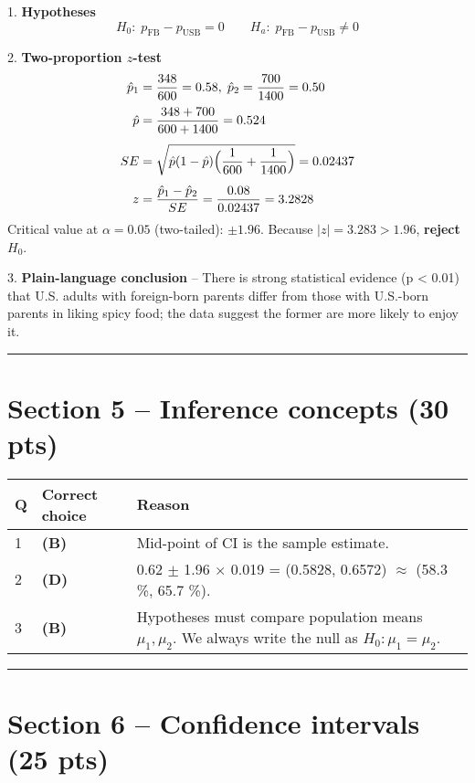 \documentclass{article}
\begin{document}
1. \textbf{Hypotheses}
$$
H_0:\;p_{\text{FB}}-p_{\text{USB}}=0 \qquad
H_a:\;p_{\text{FB}}-p_{\text{USB}}\neq 0
$$

2. \textbf{Two-proportion $z$-test}
$$
\begin{aligned}
\hat p_1&=\frac{348}{600}=0.58,\;
\hat p_2=\frac{700}{1400}=0.50\\[2pt]
\hat p&=\frac{348+700}{600+1400}=0.524\\[4pt]
SE&=\sqrt{\hat p(1-\hat p)\Bigl(\frac1{600}+\frac1{1400}\Bigr)}=0.02437\\[4pt]
z&=\frac{\hat p_1-\hat p_2}{SE}=\frac{0.08}{0.02437}=3.2828
\end{aligned}
$$
Critical value at $\alpha = 0.05$ (two-tailed): $\pm1.96$.
Because $|z| = 3.283 > 1.96$, \textbf{reject $H_0$}.

3. \textbf{Plain-language conclusion} – There is strong statistical evidence (p < 0.01) that U.S. adults with foreign-born parents differ from those with U.S.-born parents in liking spicy food; the data suggest the former are more likely to enjoy it.

\vspace{1em} %
\hrule %

\section*{Section 5 – Inference concepts (30 pts)}

\begin{tabular}{p{} p{} p{}}
\toprule
\textbf{Q} & \textbf{Correct choice} & \textbf{Reason} \\
\midrule
1 & \textbf{(B)} & Mid-point of CI is the sample estimate. \\
2 & \textbf{(D)} & 0.62 $\pm$ 1.96 $\times$ 0.019 = (0.5828, 0.6572) $\approx$ (58.3 \%, 65.7 \%). \\
3 & \textbf{(B)} & Hypotheses must compare population means $\mu_1,\mu_2$. We always write the null as $H_0 : \mu_1=\mu_2$. \\
\bottomrule
\end{tabular}

\vspace{1em} %
\hrule %

\section*{Section 6 – Confidence intervals (25 pts)}
\end{document}

